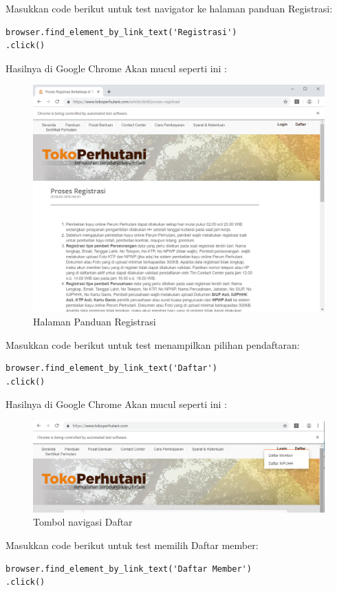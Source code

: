 Masukkan code berikut untuk test navigator ke halaman panduan Registrasi:
\begin{verbatim}
browser.find_element_by_link_text('Registrasi')
.click()
\end{verbatim}

Hasilnya  di Google Chrome Akan mucul seperti ini :
\begin{figure}[h]
	\centering
	\includegraphics[scale=0.24]{figures/1pdregis}
	\caption{Halaman Panduan Registrasi}
\end{figure}

Masukkan code berikut untuk test menampilkan pilihan pendaftaran:
\begin{verbatim}
browser.find_element_by_link_text('Daftar')
.click()
\end{verbatim}

Hasilnya  di Google Chrome Akan mucul seperti ini :
\begin{figure}[h]
	\centering
	\includegraphics[scale=0.42]{figures/2daftar}
	\caption{Tombol navigasi Daftar}
\end{figure}

Masukkan code berikut untuk test memilih Daftar member:
\begin{verbatim}
browser.find_element_by_link_text('Daftar Member')
.click()
\end{verbatim}

